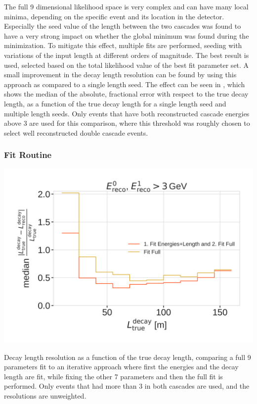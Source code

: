 The full 9 dimensional likelihood space is very complex and can have many local minima, depending on the specific event and its location in the detector. Especially the seed value of the length between the two cascades was found to have a very strong impact on whether the global minimum was found during the minimization. To mitigate this effect, multiple fits are performed, seeding with variations of the input length at different orders of magnitude. The best result is used, selected based on the total likelihood value of the best fit parameter set. A small improvement in the decay length resolution can be found by using this approach as compared to a single length seed. The effect can be seen in , which shows the median of the absolute, fractional error with respect to the true decay length, as a function of the true decay length for a single length seed and multiple length seeds. Only events that have both reconstructed cascade energies above \SI{3}{\gev} are used for this comparison, where this threshold was roughly chosen to select well reconstructed double cascade events.


\subsubsection{Fit Routine}

\begin{marginfigure}
	\centering
    \includegraphics{figures/results/190605_reco_optimization/fit_routine_splitting_median_decay_length_resolution_Good + L7 + reco E1,E2 above 3_fix_y.png}
    \caption[Decay length resolution to optimize fit routine]{Decay length resolution as a function of the true decay length, comparing a full 9 parameters fit to an iterative approach where first the energies and the decay length are fit, while fixing the other 7 parameters and then the full fit is performed. Only events that had more than \SI{3}{\gev} in both cascades are used, and the resolutions are unweighted.}
\end{marginfigure}

